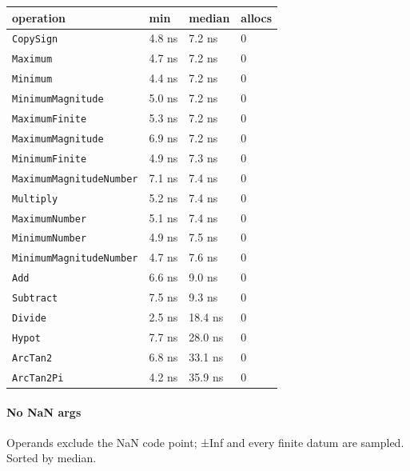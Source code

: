 \begin{table}[h]
\centering
\nopagebreak[3]
\begin{tabulary}{\linewidth}{L L L L}
\toprule
operation & min & median & allocs \\
\toprule
\texttt{CopySign} & 4.8 ns & 7.2 ns & 0 \\
\texttt{Maximum} & 4.7 ns & 7.2 ns & 0 \\
\texttt{Minimum} & 4.4 ns & 7.2 ns & 0 \\
\texttt{MinimumMagnitude} & 5.0 ns & 7.2 ns & 0 \\
\texttt{MaximumFinite} & 5.3 ns & 7.2 ns & 0 \\
\texttt{MaximumMagnitude} & 6.9 ns & 7.2 ns & 0 \\
\texttt{MinimumFinite} & 4.9 ns & 7.3 ns & 0 \\
\texttt{MaximumMagnitudeNumber} & 7.1 ns & 7.4 ns & 0 \\
\texttt{Multiply} & 5.2 ns & 7.4 ns & 0 \\
\texttt{MaximumNumber} & 5.1 ns & 7.4 ns & 0 \\
\texttt{MinimumNumber} & 4.9 ns & 7.5 ns & 0 \\
\texttt{MinimumMagnitudeNumber} & 4.7 ns & 7.6 ns & 0 \\
\texttt{Add} & 6.6 ns & 9.0 ns & 0 \\
\texttt{Subtract} & 7.5 ns & 9.3 ns & 0 \\
\texttt{Divide} & 2.5 ns & 18.4 ns & 0 \\
\texttt{Hypot} & 7.7 ns & 28.0 ns & 0 \\
\texttt{ArcTan2} & 6.8 ns & 33.1 ns & 0 \\
\texttt{ArcTan2Pi} & 4.2 ns & 35.9 ns & 0 \\
\bottomrule
\end{tabulary}

\end{table}



\paragraph{No NaN args}\indent



\label{5394694367249928840}{}


Operands exclude the NaN code point; ±Inf and every finite datum are sampled. Sorted by median.




